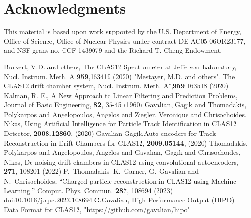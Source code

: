 \documentclass[preprint,12pt]{elsarticle}
\begin{document}
\section{Acknowledgments}
This material is based upon work supported by the U.S. Department of Energy, Office of Science, Office of Nuclear Physics under contract DE-AC05-06OR23177, and NSF grant no. CCF-1439079 and the Richard T. Cheng Endowment. 
 
 
 \begin{thebibliography}{}
Burkert, V.D. and others, The CLAS12 Spectrometer at Jefferson Laboratory, Nucl. Instrum. Meth. A \textbf{959},163419 (2020)
 "Mestayer, M.D. and others", The CLAS12 drift chamber system, Nucl. Instrum. Meth. A",\textbf{959} 163518 (2020)
  Kalman, R. E., A New Approach to Linear Filtering and Prediction Problems, Journal of Basic Engineering, \textbf{82}, 35-45 (1960)
Gavalian, Gagik and Thomadakis, Polykarpos and Angelopoulos, Angelos and Ziegler, Veronique and Chrisochoides, Nikos, Using Artificial Intelligence for Particle Track Identification in CLAS12 Detector, \textbf{2008.12860}, (2020)
 Gavalian Gagik,Auto-encoders for Track Reconstruction in Drift Chambers for CLAS12, \textbf{2009.05144}, (2020)
   Thomadakis, Polykarpos and Angelopoulos, Angelos and Gavalian, Gagik and Chrisochoides, Nikos, De-noising drift chambers in CLAS12 using convolutional autoencoders, \textbf{271}, 108201 (2022)   
P.~Thomadakis, K.~Garner, G.~Gavalian and N.~Chrisochoides,
``Charged particle reconstruction in CLAS12 using Machine Learning,''
Comput. Phys. Commun. \textbf{287}, 108694 (2023) doi:10.1016/j.cpc.2023.108694
  G.Gavalian, High-Performance Output (HIPO) Data Format for CLAS12,  "https://github.com/gavalian/hipo"
\end{thebibliography}
 
%
%
\end{document}
